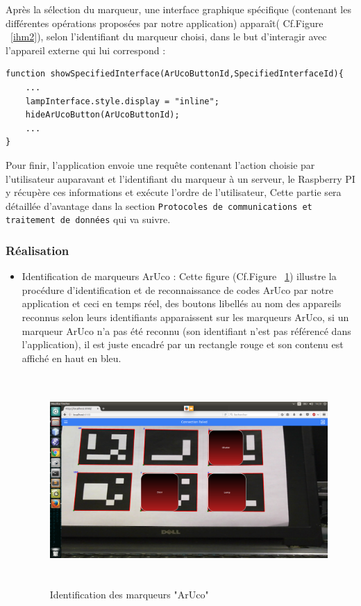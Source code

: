 \documentclass[12pt,a4paper]{article}
\begin{document}
 Après la sélection du marqueur, une interface graphique spécifique (contenant les différentes opérations proposées par notre application) apparaît( Cf.Figure ~\ref{ihm2}), selon l'identifiant du marqueur choisi, dans le but d'interagir avec l'appareil externe qui lui correspond :
\begin{lstlisting}
function showSpecifiedInterface(ArUcoButtonId,SpecifiedInterfaceId){
	...
	lampInterface.style.display = "inline";
	hideArUcoButton(ArUcoButtonId);
	...
}

\end{lstlisting}

	Pour finir, l'application envoie une requête contenant l'action choisie par l'utilisateur auparavant  et l'identifiant du marqueur à un serveur, le Raspberry PI y récupère ces informations et exécute l'ordre de l'utilisateur, Cette partie sera détaillée d'avantage dans la section \texttt{Protocoles de communications et traitement de données} qui va suivre.
    
\subsubsection{Réalisation } 
\begin{itemize}
\item Identification de marqueurs ArUco :
Cette figure (Cf.Figure ~\ref{ihm1}) illustre la procédure d'identification et de reconnaissance de codes ArUco par notre application et ceci en temps réel, des boutons libellés au nom des appareils reconnus selon leurs identifiants apparaissent sur les marqueurs ArUco, si un marqueur ArUco n'a pas été reconnu (son identifiant n'est pas référencé dans l'application), il est juste encadré par un rectangle rouge et son contenu est affiché en haut en bleu. 
\begin{figure}[H]
  \centering
   \label{ihm1}
    \includegraphics[width = 11cm,height=8cm]{3.png}
     \caption{Identification des marqueurs "ArUco"}
\end{figure}
\end{itemize}
\end{document}
